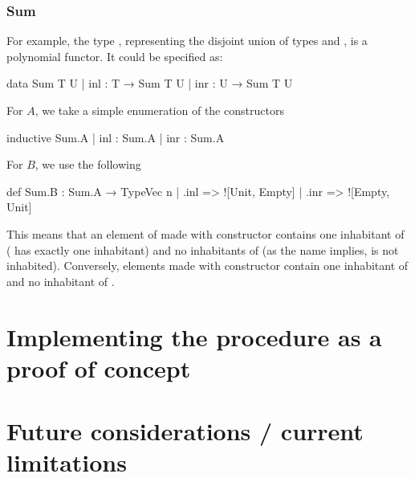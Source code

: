 \documentclass[titlepage]{report}
\begin{document}
\subsection*{Sum}
For example, the type , representing the disjoint union of types  and ,
is a polynomial functor. It could be specified as:
\begin{leancode}
    data Sum T U
    | inl : T → Sum T U
    | inr : U → Sum T U
\end{leancode}
For $A$, we take a simple enumeration of the constructors
\begin{leancode}
    inductive Sum.A
    | inl : Sum.A
    | inr : Sum.A
\end{leancode}
For $B$, we use the following
\begin{leancode}
    def Sum.B : Sum.A → TypeVec n
    | .inl => ![Unit, Empty]
    | .inr => ![Empty, Unit]
\end{leancode}
This means that an element of  made with constructor  contains one inhabitant of  ( has exactly one inhabitant) and no inhabitants of  (as the name implies,  is not inhabited). Conversely, elements made with constructor  contain one inhabitant of  and no inhabitant of .





















\chapter{Implementing the procedure as a proof of concept}
\label{ch:implementing}










\chapter{Future considerations / current limitations}
\label{ch:limitations}
\end{document}
